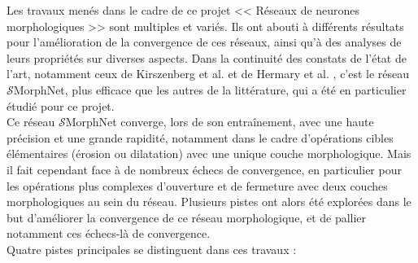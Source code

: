 Les travaux menés dans le cadre de ce projet << Réseaux de neurones morphologiques >> sont multiples et variés. Ils ont abouti à différents résultats pour l'amélioration de la convergence de ces réseaux, ainsi qu'à des analyses de leurs propriétés sur diverses aspects. Dans la continuité des constats de l'état de l'art, notamment ceux de Kirszenberg et al. \cite{Kirszenberg_2021} et de Hermary et al. \cite{Hermary_2022}, c'est le réseau $\mathcal{S}$MorphNet, plus efficace que les autres de la littérature, qui a été en particulier étudié pour ce projet. \\

\vspace{-1.0mm}
\noindent Ce réseau $\mathcal{S}$MorphNet converge, lors de son entraînement, avec une haute précision et une grande rapidité, notamment dans le cadre d'opérations cibles élémentaires (érosion ou dilatation) avec une unique couche morphologique. Mais il fait cependant face à de nombreux échecs de convergence, en particulier pour les opérations plus complexes d'ouverture et de fermeture avec deux couches morphologiques au sein du réseau. Plusieurs pistes ont alors été explorées dans le but d'améliorer la convergence de ce réseau morphologique, et de pallier notamment ces échecs-là de convergence. \\

\vspace{-1.0mm}
\noindent Quatre pistes principales se distinguent dans ces travaux : \\

